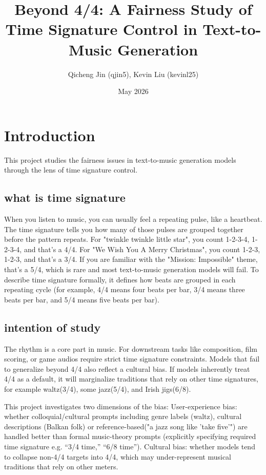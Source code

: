 \documentclass{article}
\title{Beyond 4/4: A Fairness Study of Time Signature Control in Text-to-Music Generation }
\author{Qicheng Jin (qjin5), Kevin Liu (kevinl25)}
\date{May 2026}
\begin{document}
\setlength{\droptitle}{-8.5em} 
\maketitle
\vspace{-1.5em}                

\section{Introduction}

This project studies the fairness issues in text-to-music generation models through the lens of time signature control. 

\subsection{what is time signature}

When you listen to music, you can usually feel a repeating pulse, like a heartbeat. The time signature tells you how many of those pulses are grouped together before the pattern repeats. For "twinkle twinkle little star", you count 1-2-3-4, 1-2-3-4, and that's a 4/4. For "We Wish You A Merry Christmas", you count 1-2-3, 1-2-3, and that's a 3/4. If you are familiar with the "Mission: Impossible" theme, that's a 5/4, which is rare and most text-to-music generation models will fail. To describe time signature formally, it defines how beats are grouped in each repeating cycle (for example, 4/4 means four beats per bar, 3/4 means three beats per bar, and 5/4 means five beats per bar). 

\subsection{intention of study}

The rhythm is a core part in music. For downstream tasks like composition, film scoring, or game audios require strict time signature constraints. Models that fail to generalize beyond 4/4 also reflect a cultural bias. If models inherently treat 4/4 as a default, it will marginalize traditions that rely on other time signatures, for example waltz(3/4), some jazz(5/4), and Irish jigs(6/8). 

This project investigates two dimensions of the bias:
User-experience bias: whether colloquial/cultural prompts including genre labels (waltz), cultural descriptions (Balkan folk) or reference-based("a jazz song like 'take five'") are handled better than formal music-theory prompts (explicitly specifying required time signature e.g. “3/4 time,” “6/8 time”). 
Cultural bias: whether models tend to collapse non-4/4 targets into 4/4, which may under-represent musical traditions that rely on other meters.
\end{document}
